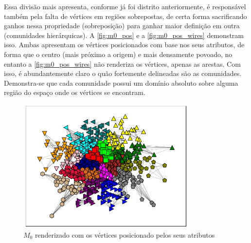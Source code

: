 \documentclass[notes.tex]{subfiles}
\begin{document}
Essa divisão mais apresenta, conforme já foi distrito anteriormente, é responsável também pela falta de vértices em regiões sobrepostas, de certa forma sacrificando ganhos nessa propriedade (sobreposição) para ganhar maior definição em outra (comunidades hierárquicas).
A \autoref{fig:m0_pos} e a \autoref{fig:m0_pos_wires} demonstram isso.
Ambas apresentam os vértices posicionados com base nos seus atributos, de forma que o centro (mais próximo a origem) e mais densamente povoado, no entanto a \autoref{fig:m0_pos_wires} não renderiza os vértices, apenas as arestas.
Com isso, é abundantemente claro o quão fortemente delineadas são as comunidades.
Demonstra-se que cada comunidade possui um domínio absoluto sobre alguma região do espaço onde os vértices se encontram.

\begin{figure}[htpb]
    \centering
    \caption{$M_0$ renderizado com os vértices posicionado pelos seus atributos}\label{fig:m0_pos}
    \includegraphics[width=0.8\textwidth, height=0.32\textheight]{figures/m0_pos.png}
\end{figure}
\end{document}
